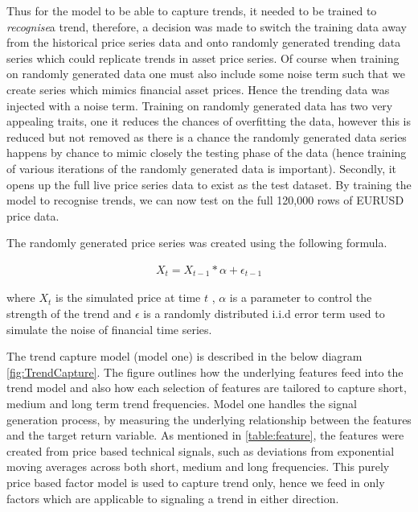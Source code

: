 \documentclass[11pt]{article}
\begin{document}
Thus for the model to be able to capture trends, it needed to be trained to \textit{recognise}a trend, therefore, a decision was made to switch the training data away from the historical price series data and onto randomly generated trending data series which could replicate trends in asset price series. Of course when training on randomly generated data one must also include some noise term such that we create series which mimics financial asset prices. Hence the trending data was injected with a noise term.
Training on randomly generated data has two very appealing traits, one it reduces the chances of overfitting the data, however this is reduced but not removed as there is a chance the randomly generated data series happens by chance to mimic closely the testing phase of the data (hence training of various iterations of the randomly generated data is important). Secondly, it opens up the full live price series data to exist as the test dataset. By training the model to recognise trends, we can now test on the full 120,000 rows of EURUSD price data. 

The randomly generated price series was created using the following formula.

\begin{align}
X_{t} = X_{t-1}*\alpha + \epsilon_{t-1} 
\end{align}

where $X_{t}$ is the simulated price at time $t$ , $\alpha$ is a parameter to control the strength of the trend and $\epsilon$ is a randomly distributed i.i.d error term used to simulate the noise of financial time series.

The trend capture model (model one) is described in the below diagram \ref{fig:TrendCapture}. The figure outlines how the underlying features feed into the trend model and also how each selection of features are tailored to capture short, medium and long term trend frequencies. Model one handles the signal generation process, by measuring the underlying relationship between the features and the target return variable. As mentioned in \ref{table:feature}, the features were created from price based technical signals, such as deviations from exponential moving averages across both short, medium and long frequencies. This purely price based factor model is used to capture trend only, hence we feed in only factors which are applicable to signaling a trend in either direction.  
\end{document}
